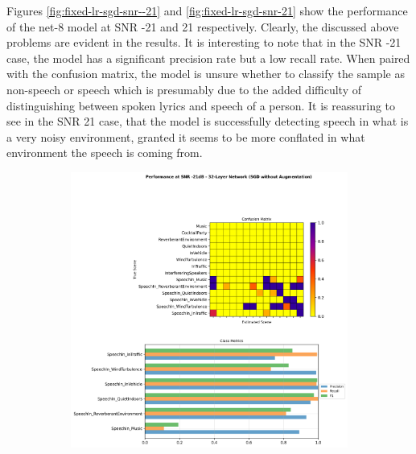 \documentclass[logo,bsc,singlespacing,parskip,online]{infthesis}
\begin{document}
Figures \ref{fig:fixed-lr-sgd-snr--21} and \ref{fig:fixed-lr-sgd-snr-21} show 
the performance of the net-8 model at SNR -21 and 21 respectively.
Clearly, the discussed above problems are evident in the results. 
It is interesting to note that in the SNR -21 case, 
the model has a significant precision rate but a low recall rate. 
When paired with the confusion matrix, the model 
is unsure whether to classify the sample as non-speech or speech
which is presumably due to the added difficulty of distinguishing 
between spoken lyrics and speech of a person. 
It is reassuring to see in the SNR 21 case, that the model 
is successfully detecting speech in what is a very noisy environment,
granted it seems to be more conflated in what environment the speech is coming from.

\begin{figure}[h]
   \centering
   \begin{subfigure}[b]{0.48\textwidth}
      \centering
      \includegraphics[width=\textwidth]{net-32/FIXED-fixed-lr-sgd/snr_-21_performance.png}
      \caption{}
      \label{fig:fixed-lr-sgd-snr--21-net-32}
   \end{subfigure}
   \hfill
   \begin{subfigure}[b]{0.48\textwidth}  
         \centering

\end{subfigure}
\end{figure}
\end{document}
